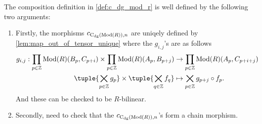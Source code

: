 \begin{remark}
    The composition definition in \autoref{def:c_dg_mod_r} is well defined by the following two arguments:

    \begin{enumerate}
        \item {
            Firstly, the morphisms \( c_{\operatorname{C}_{\operatorname{dg}}(\operatorname{Mod}(R)), n} \) are uniqely defined by \autoref{lem:map_out_of_tensor_unique} where the \( g_{i, j} \)'s are as follows
            \begin{align*}
                g_{i, j}: \prod_{p \in \Zb} \Mod(R)(B_p, C_{p + i}) \times \prod_{p \in \Zb} \Mod(R)(A_p, B_{p + j}) &\to \prod_{p \in \Zb} \Mod(R)(A_p, C_{p + i + j}) \\
                \tuple{ \bigtimes_{p \in \Zb} g_p } \times \tuple{ \bigtimes_{q \in \Zb} f_q } &\mapsto \bigtimes_{p \in \Zb} g_{p + j} \circ f_p.
            \end{align*}
            And these can be checked to be \( R \)-bilinear.
        }
        \item {
            Secondly, need to check that the \( c_{\operatorname{C}_{\operatorname{dg}}(\operatorname{Mod}(R)), n} \)'s form a chain morphism.

}
\end{enumerate}
\end{remark}
